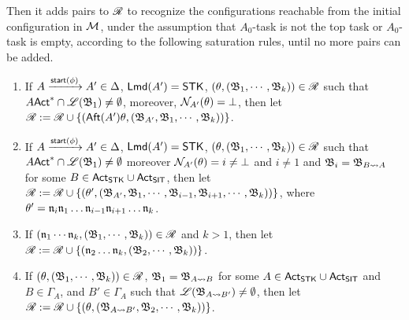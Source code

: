 {Then it adds pairs to $\mathscr{R}$ to recognize the configurations reachable from the initial configuration in ${\mathcal{M} }$, under the assumption that $A_0$-task is not the top task or $A_0$-task is empty, according to the following saturation rules, until no more pairs can be added.

\smallskip
\fbox
{
\begin{minipage}{0.9\textwidth}
\begin{enumerate}
    \item If $A\xrightarrow{{\mathsf{start} }(\phi)}A'\in\Delta$, ${\sf Lmd}(A') = \mathsf{STK}$, 
    $(\theta, ({\mathfrak{B} }_1,\cdots,{\mathfrak{B} }_k)) \in \mathscr{R}$ such that $A{\sf Act}^*\cap{\mathscr{L} }({\mathfrak{B} }_1)\neq \emptyset$, moreover, $\mathcal{N}_{A'}(\theta) = \bot$, 
    then let $\mathscr{R}:=\mathscr{R}\cup\{({\sf Aft}(A')\theta, ({\mathfrak{B} }_{A'},{\mathfrak{B} }_1,\cdots,{\mathfrak{B} }_k))\}$.
    \item If $A\xrightarrow{{\mathsf{start} }(\phi)}A'\in\Delta$, ${\sf Lmd}(A') = \mathsf{STK}$, $(\theta, ({\mathfrak{B} }_1,\cdots,{\mathfrak{B} }_k)) \in \mathscr{R}$ such that $A{\sf Act}^*\cap{\mathscr{L} }({\mathfrak{B} }_1)\neq \emptyset$ moreover $\mathcal{N}_{A'}(\theta) = i \neq\bot$ and $i\neq 1$ and ${\mathfrak{B} }_i = {\mathfrak{B} }_{B\rightsquigarrow A}$ for some $B\in{\sf Act}_{\mathsf{STK}}\cup{\sf Act}_{\mathsf{SIT}}$,
    then let $\mathscr{R}:=\mathscr{R}\cup\{(\theta', ({\mathfrak{B} }_{A'},{\mathfrak{B} }_1,\cdots,{\mathfrak{B} }_{i-1},{\mathfrak{B} }_{i+1},\cdots,{\mathfrak{B} }_{k}))\}$, where $\theta' = \mathfrak{n}_i\mathfrak{n}_1\dots\mathfrak{n}_{i-1}\mathfrak{n}_{i+1}\dots\mathfrak{n}_k$.
    \item If $(\mathfrak{n}_1\cdots\mathfrak{n}_k, ({\mathfrak{B} }_1,\cdots,{\mathfrak{B} }_k)) \in \mathscr{R}$ and $k>1$,
    then let $\mathscr{R}:=\mathscr{R}\cup\{(\mathfrak{n}_2\dots\mathfrak{n}_k, ({\mathfrak{B} }_2,\cdots,{\mathfrak{B} }_k))\}$.
    \item If $(\theta, ({\mathfrak{B} }_1,\cdots,{\mathfrak{B} }_k)) \in \mathscr{R}$, ${\mathfrak{B} }_1 = {\mathfrak{B} }_{A\rightsquigarrow B}$ for some $A\in{\sf Act}_{\mathsf{STK}}\cup{\sf Act}_{\mathsf{SIT}}$ and $B \in \Gamma_A$, and $B'  \in \Gamma_A$ such that ${\mathscr{L} }({\mathfrak{B} }_{A\rightsquigarrow B'}) \neq \emptyset$, then let 
    $\mathscr{R} := \mathscr{R} \cup \{(\theta, ({\mathfrak{B} }_{A\rightsquigarrow B'}, {\mathfrak{B} }_2,\cdots,{\mathfrak{B} }_k))\}$. 
\end{enumerate}
\end{minipage}
}
}
